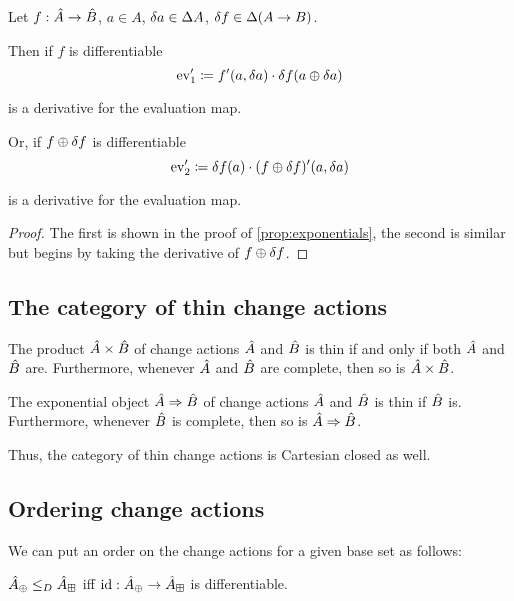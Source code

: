 \begin{prop}
\label{prop:evDerivatives}
  Let $f: \hat{A} \rightarrow \hat{B}$, $a \in A$, $\delta a \in
  \Delta A$, $\delta f \in \Delta (A \rightarrow B)$.

  Then if $f$ is differentiable
  $$\operatorname{ev}'_1 \coloneqq f'(a, \delta a) \cdot \delta f(a \oplus \delta a)$$

  is a derivative for the evaluation map.
  
  Or, if $f \oplus \delta f$ is differentiable
  $$\operatorname{ev}'_2 \coloneqq \delta f(a) \cdot (f \oplus \delta f)'(a, \delta a)$$

  is a derivative for the evaluation map.
\end{prop}
\ifproofs
\begin{proof}
  The first is shown in the proof of \cref{prop:exponentials}, the second is
  similar but begins by taking the derivative of $f \oplus \delta f$.
\end{proof}
\fi

\subsection{The category of thin change actions}

\begin{prop}
  The product $\hat{A} \times \hat{B}$ of change actions $\hat{A}$ and $\hat{B}$ is thin if and only if both $\hat{A}$ and $\hat{B}$ are.
  Furthermore, whenever $\hat{A}$ and $\hat{B}$ are complete, then so is $\hat{A} \times \hat{B}$.

  The exponential object $\hat{A} \Rightarrow \hat{B}$ of change actions $\hat{A}$ and $\hat{B}$ is thin if $\hat{B}$ is. 
  Furthermore, whenever $\hat{B}$ is complete, then so is $\hat{A} \Rightarrow \hat{B}$.
\end{prop}

Thus, the category of thin change actions is Cartesian closed as well.

\subsection{Ordering change actions}

We can put an order on the change actions for a given base set as follows:

\begin{defn}
  $\hat{A}_\oplus \leq_D \hat{A}_\boxplus$ iff $\textrm{id}: \hat{A}_\oplus \rightarrow \hat{A}_\boxplus$ is differentiable.
\end{defn}

